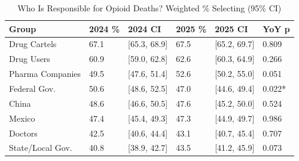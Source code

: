 \begin{table}[!h]
\centering
\caption{Who Is Responsible for Opioid Deaths? Weighted \% Selecting (95\% CI)}
\centering
\begin{tabular}[t]{llllll}
\toprule
Group & 2024 \% & 2024 CI & 2025 \% & 2025 CI & YoY p\\
\midrule
Drug Cartels & 67.1 & {}[65.3, 68.9] & 67.5 & {}[65.2, 69.7] & 0.809\\
Drug Users & 60.9 & {}[59.0, 62.8] & 62.6 & {}[60.3, 64.9] & 0.266\\
Pharma Companies & 49.5 & {}[47.6, 51.4] & 52.6 & {}[50.2, 55.0] & 0.051\\
Federal Gov. & 50.6 & {}[48.6, 52.5] & 47.0 & {}[44.6, 49.4] & 0.022*\\
China & 48.6 & {}[46.6, 50.5] & 47.6 & {}[45.2, 50.0] & 0.524\\
Mexico & 47.4 & {}[45.4, 49.3] & 47.3 & {}[44.9, 49.7] & 0.986\\
Doctors & 42.5 & {}[40.6, 44.4] & 43.1 & {}[40.7, 45.4] & 0.707\\
State/Local Gov. & 40.8 & {}[38.9, 42.7] & 43.5 & {}[41.2, 45.9] & 0.073\\
\bottomrule
\end{tabular}
\end{table}

